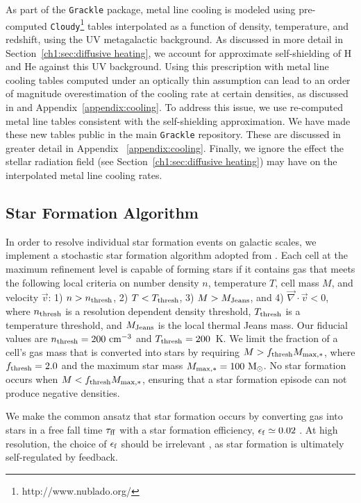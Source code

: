As part of the \texttt{Grackle} package, metal line cooling is modeled using pre-computed \texttt{Cloudy}\footnote{http://www.nublado.org/} \citep{Cloudy2013}  tables interpolated as a function of density, temperature, and redshift, using the \citet{HM2012} UV metagalactic background. As discussed in more detail in Section~\ref{ch1:sec:diffusive heating}, we account for approximate self-shielding of H and He against this UV background. Using this prescription with metal line cooling tables computed under an optically thin assumption can lead to an order of magnitude overestimation of the cooling rate at certain densities, as discussed in \citet{Hu2017} and  Appendix~\ref{appendix:cooling}. To address this issue, we use re-computed metal line tables consistent with the self-shielding approximation.  We have made these new tables public in the main \texttt{Grackle} repository. These are discussed in greater detail in Appendix ~\ref{appendix:cooling}. Finally, we ignore the effect the stellar radiation field (see Section~\ref{ch1:sec:diffusive heating}) may have on the interpolated metal line cooling rates.

\subsection{Star Formation Algorithm}
\label{ch1:sec:star formation}
In order to resolve individual star formation events on galactic scales, we implement a stochastic star formation algorithm adopted from \citet{Goldbaum2015,Goldbaum2016}. Each cell at the maximum refinement level is capable of forming stars if it contains gas that meets the following local criteria on number density $n$, temperature $T$, cell mass $M$, and velocity $\vec{v}$: 1) $n > n_{\rm thresh}$, 2) $T < T_{\rm thresh}$, 3) $M > M_{\rm Jeans}$, and 4) $\vec{\nabla} \cdot \vec{v} < 0$, where $n_{\rm thresh}$ is a resolution dependent density threshold, $T_{\rm thresh}$ is a temperature threshold, and $M_{\rm Jeans}$ is the local thermal Jeans mass. Our fiducial values are $n_{\rm thresh} =  200 \mbox{ cm}^{-3}$ and $T_{\rm thresh}= 200$~K. We limit the fraction of a cell's gas mass that is converted into stars by requiring $M > f_{\rm thresh} M_{\rm max,*}$, where $f_{\rm thresh} = 2.0 $ and the maximum star mass $M_{\rm max,*} = 100 \mbox{ M}_{\odot}$. No star formation occurs when $M < f_{\rm thresh} M_{\rm max,*}$, ensuring that a star formation episode can not produce negative densities.

We make the common ansatz that star formation occurs by converting gas into stars in a free fall time $\tau_{\rm ff}$ with a star formation efficiency, $\epsilon_{\rm f} \simeq 0.02$ \citep{KrumholzTan2007}. At high resolution, the choice of $\epsilon_{\rm f}$ should be irrelevant \citep{Orr2018, FIRE2}, as star formation is ultimately self-regulated by feedback.

